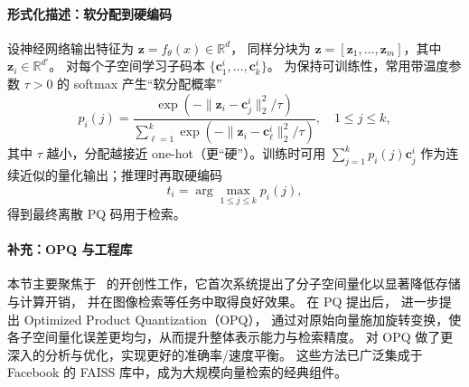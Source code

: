 \documentclass[lang=cn,newtx,10pt,scheme=chinese,chinesefont=nofont,citestyle=gb7714-2015, bibstyle=gb7714-2015]{elegantbook}
\begin{document}
\begin{refsection}
\paragraph{形式化描述：软分配到硬编码}
设神经网络输出特征为 $\mathbf{z}=f_{\theta}(x)\in\mathbb{R}^d$，
同样分块为 $\mathbf{z}=[\mathbf{z}_1,\ldots,\mathbf{z}_m]$，其中 $\mathbf{z}_i\in\mathbb{R}^{d'}$。
对每个子空间学习子码本 $\{\mathbf{c}_1^i,\ldots,\mathbf{c}_k^i\}$。
为保持可训练性，常用带温度参数 $\tau>0$ 的 softmax 产生“软分配概率”
\begin{equation}
p_i(j)=\frac{\exp\!\left(-\|\mathbf{z}_i-\mathbf{c}_j^i\|_2^2/\tau\right)}
{\sum_{\ell=1}^k \exp\!\left(-\|\mathbf{z}_i-\mathbf{c}_\ell^i\|_2^2/\tau\right)},\quad 1\le j\le k,
\end{equation}
其中 $\tau$ 越小，分配越接近 one-hot（更“硬”）。训练时可用
$\sum_{j=1}^k p_i(j)\mathbf{c}_j^i$ 作为连续近似的量化输出；推理时再取硬编码
\[
t_i=\arg\max_{1\le j\le k} p_i(j),
\]
得到最终离散 PQ 码用于检索。

\paragraph{补充：OPQ 与工程库}
本节主要聚焦于~\cite{5432202} 的开创性工作，它首次系统提出了分子空间量化以显著降低存储与计算开销，
并在图像检索等任务中取得良好效果。
在 PQ 提出后，\cite{jegou2011searching} 进一步提出 Optimized Product Quantization（OPQ），
通过对原始向量施加旋转变换，使各子空间量化误差更均匀，从而提升整体表示能力与检索精度。
\cite{6678503} 对 OPQ 做了更深入的分析与优化，实现更好的准确率/速度平衡。
这些方法已广泛集成于 Facebook 的 FAISS 库中，成为大规模向量检索的经典组件。

\printbibliography[heading=subbibliography, title={本章参考文献}]
\end{refsection}
\end{document}
